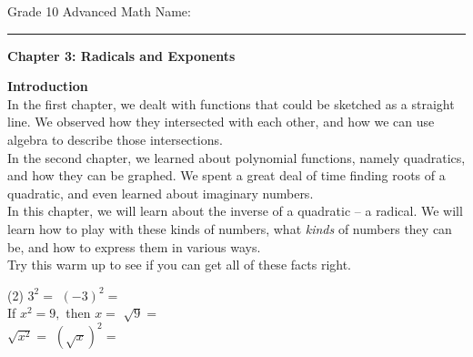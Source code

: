 \documentclass[12pt,fleqn]{book}
\begin{document}
\noindent
\thispagestyle{empty}
Grade 10 Advanced Math \hfill Name: \hspace{2in}
\medskip\hrule
\noindent

\vfill

\begin{center}
    {\bf \huge Chapter 3: Radicals and Exponents}
\end{center}

\vfill
\vfill

\clearpage

\setcounter{page}{1}

{\bf \huge Introduction }
\\[1in]
In the first chapter, we dealt with functions that could be sketched as a straight line.  We observed how they intersected with each other, and how we can use algebra to describe those intersections.
\\[1em]
In the second chapter, we learned about polynomial functions, namely quadratics, and how they can be graphed.  We spent a great deal of time finding roots of a quadratic, and even learned about imaginary numbers.
\\[1em]
In this chapter, we will learn about the inverse of a quadratic -- a radical.  We will learn how to play with these kinds of numbers, what \emph{kinds} of numbers they can be, and how to express them in various ways.
\\[1em]
Try this warm up to see if you can get all of these facts right.
\begin{tasks}(2)
    \task $3^2=$
    \task $(-3)^2=$
    \\[1in]
    \task If $x^2=9,$ then $x=$
    \task $\sqrt 9 =$
    \\[1in]
    \task $\sqrt{x^2}=$
    \task $(\sqrt x)^2=$
\end{tasks}
\clearpage
\end{document}
